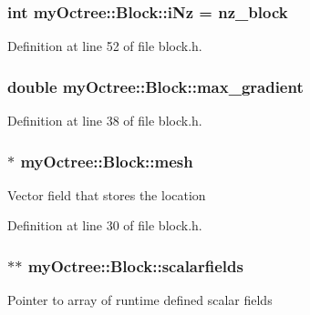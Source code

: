 \hypertarget{classmy_octree_1_1_block_a1cf85662b6815a2a4e6f013b15fb884a}{}
\subsubsection[{i\+Nz}]{\setlength{\rightskip}{0pt plus 5cm}int my\+Octree\+::\+Block\+::i\+Nz = {\bf nz\+\_\+block}\hspace{0.3cm}{\ttfamily [static]}}\label{classmy_octree_1_1_block_a1cf85662b6815a2a4e6f013b15fb884a}


Definition at line 52 of file block.\+h.

\hypertarget{classmy_octree_1_1_block_ad2e19ba33e0303906c6edca9344224e4}{}
\subsubsection[{max\+\_\+gradient}]{\setlength{\rightskip}{0pt plus 5cm}double my\+Octree\+::\+Block\+::max\+\_\+gradient}\label{classmy_octree_1_1_block_ad2e19ba33e0303906c6edca9344224e4}


Definition at line 38 of file block.\+h.

\hypertarget{classmy_octree_1_1_block_aef557ded62cd3b3441861a98e0a43a9d}{}
\subsubsection[{mesh}]{$\ast$ my\+Octree\+::\+Block\+::mesh}\label{classmy_octree_1_1_block_aef557ded62cd3b3441861a98e0a43a9d}
Vector field that stores the location 

Definition at line 30 of file block.\+h.

\hypertarget{classmy_octree_1_1_block_a0bac722408089bfe10dbdf2d8f5fe7bd}{}
\subsubsection[{scalarfields}]{$\ast$$\ast$ my\+Octree\+::\+Block\+::scalarfields}\label{classmy_octree_1_1_block_a0bac722408089bfe10dbdf2d8f5fe7bd}
Pointer to array of runtime defined scalar fields 

